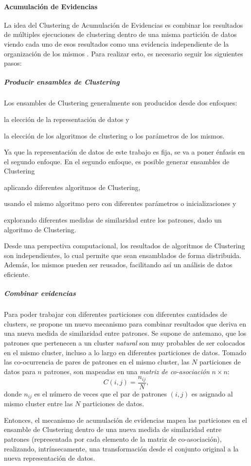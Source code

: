 \paragraph{Acumulación de Evidencias}
La idea del Clustering de Acumulación de Evidencias es combinar los resultados de múltiples ejecuciones de clustering dentro de una misma partición de datos viendo cada uno de esos resultados como una evidencia independiente de la organización de los mismos \citep{fred2005combining}. Para realizar esto, es necesario seguir los siguientes pasos:

\subparagraph{Producir ensambles de Clustering}
Los ensambles de Clustering generalmente son producidos desde dos enfoques:
\begin{enumerate*}
	\item la elección de la representación de datos y
	\item la elección de los algoritmos de clustering o los parámetros de los mismos.
\end{enumerate*}
Ya que la representación de datos de este trabajo es fija, se va a poner énfasis en el segundo enfoque. En el segundo enfoque, es posible generar ensambles de Clustering \begin{enumerate*} [label=(\roman*)] \item aplicando diferentes algoritmos de Clustering, \item usando el mismo algoritmo pero con diferentes parámetros o inicializaciones y \item explorando diferentes medidas de similaridad entre los patrones, dado un algoritmo de Clustering.\end{enumerate*}

\bigskip Desde una perspectiva computacional, los resultados de algoritmos de Clustering son independientes, lo cual permite que sean ensamblados de forma distribuida. Además, los mismos pueden ser reusados, facilitando así un análisis de datos eficiente.

\subparagraph{Combinar evidencias}
Para poder trabajar con diferentes particiones con diferentes cantidades de clusters, se propone un nuevo mecanismo para combinar resultados que deriva en una nueva medida de similaridad entre patrones. Se supone de antemano, que los patrones que pertenecen a un cluster \textit{natural} son muy probables de ser colocados en el mismo cluster, incluso a lo largo en diferentes particiones de datos. Tomado las co-ocurrencia de pares de patrones en el mismo cluster, las \(N\) particiones de datos para \(n\) patrones, son mapeadas en una \textit{matriz de co-asociación} \(n \times n\):
\[C(i,j)=\frac{n_{ij}}{N},\]
donde \(n_{ij}\) es el número de veces que el par de patrones \((i,j)\) es asignado al mismo cluster entre las \(N\) particiones de datos.

\bigskip Entonces, el mecanismo de acumulación de evidencias mapea las particiones en el ensamble de Clustering dentro de una nueva medida de similaridad entre patrones (representada por cada elemento de la matriz de co-asociación), realizando, intrínsecamente, una transformación desde el conjunto original a la nueva representación de datos.
